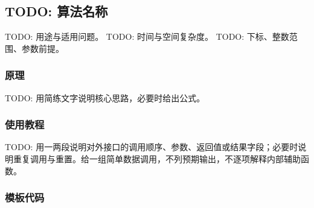 \subsection{TODO: 算法名称}
\label{algo:TODO}
\AlgorithmInfo
    {TODO: 用途与适用问题。}
    {TODO: 时间与空间复杂度。}
    {TODO: 下标、整数范围、参数前提。}

\subsubsection*{原理}
TODO: 用简练文字说明核心思路，必要时给出公式。

\subsubsection*{使用教程}
TODO: 用一两段说明对外接口的调用顺序、参数、返回值或结果字段；必要时说明重复调用与重置。给一组简单数据调用，不列预期输出，不逐项解释内部辅助函数。


\subsubsection*{模板代码}

